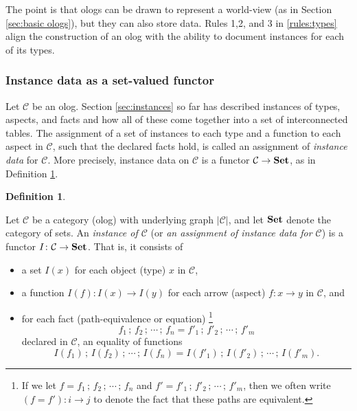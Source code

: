 \documentclass{amsart}
\def\to{\rightarrow}
\def\taking{\colon}
\def\Set{{\bf Set}}
\def\mcC{{\mathcal C}}
\theoremstyle{remark}
\theoremstyle{definition}
\newtheorem{definition}[theorem]{Definition}
\begin{document}
The point is that ologs can be drawn to represent a world-view (as in Section \ref{sec:basic ologs}), but they can also store data.  Rules 1,2, and 3 in  \ref{rules:types} align the construction of an olog with the ability to document instances for each of its types. 

\setcounter{subsubsection}{1}\subsubsection{Instance data as a set-valued functor}\label{sec:instance data}

Let $\mcC$ be an olog. Section \ref{sec:instances} so far has described instances of types, aspects, and facts and how all of these come together into a set of interconnected tables. The assignment of a set of instances to each type and a function to each aspect in $\mcC$, such that the declared facts hold, is called an assignment of {\em instance data} for $\mcC$. More precisely, instance data on $\mcC$ is a functor $\mcC\to\Set$, as in Definition \ref{def:set-valued functor}. 

\setcounter{theorem}{2}

\begin{definition}\label{def:set-valued functor}

Let $\mcC$ be a category (olog)
with underlying graph $|\mcC|$, 
and let $\Set$ denote the category of sets. 
An {\em instance of $\mcC$} 
(or {\em an assignment of instance data for $\mcC$}) 
is a functor $I\taking\mcC\to\Set$. 
That is, 
it consists of 
\begin{itemize}
\item a set $I(x)$ for each object (type) $x$ in $\mcC$,
\item a function $I(f)\taking I(x)\to I(y)$ for each arrow (aspect) $f\taking x\to y$ in $\mcC$, and 
\item for each fact (path-equivalence or equation) 
%
\footnote{If we let  
$f = f_{1} {\,;\,} f_{2} {\,;\,} \cdots {\,;\,} f_{n}$ and 
$f' = f'_{1} {\,;\,} f'_{2} {\,;\,} \cdots {\,;\,} f'_{m}$,
then we often write $(f = f') \colon i \rightarrow j$ to denote the fact that these paths are equivalent.}
%
$$f_{1} {\,;\,} f_{2} {\,;\,} \cdots {\,;\,} f_{n} = f'_{1} {\,;\,} f'_{2} {\,;\,} \cdots {\,;\,} f'_{m}$$ 
declared in $\mcC$, 
an equality of functions 
$$I(f_{1}) {\,;\,} I(f_{2}) {\,;\,} \cdots {\,;\,} I(f_{n}) = I(f'_{1}) {\,;\,} I(f'_{2}) {\,;\,} \cdots {\,;\,} I(f'_{m}).$$
\end{itemize}

\end{definition}
\end{document}
